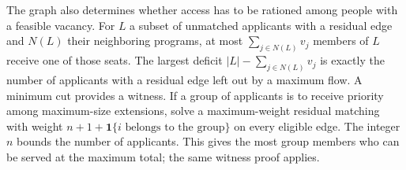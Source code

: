 The graph also determines whether access has to be rationed among people with a feasible vacancy. For $L$ a subset of unmatched applicants with a residual edge and $N(L)$ their neighboring programs, at most $\sum_{j\in N(L)}v_j$ members of $L$ receive one of those seats. The largest deficit $|L|-\sum_{j\in N(L)}v_j$ is exactly the number of applicants with a residual edge left out by a maximum flow. A minimum cut provides a witness. If a group of applicants is to receive priority among maximum-size extensions, solve a maximum-weight residual matching with weight $n+1+\mathbf{1}\{i\text{ belongs to the group}\}$ on every eligible edge. The integer $n$ bounds the number of applicants. This gives the most group members who can be served at the maximum total; the same witness proof applies.
